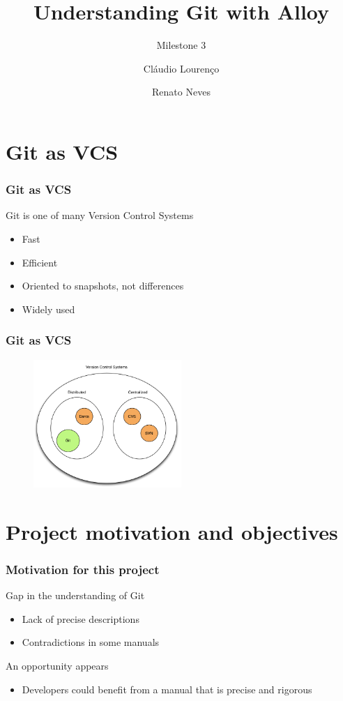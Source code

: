 \documentclass{beamer}
\title{Understanding Git with Alloy}
\subtitle{Milestone 3}
\author{Cláudio Lourenço \and Renato Neves}
\institute{University of Minho\\
Formal Methods in Software Engineering}
\begin{document}
\frame {
   \titlepage
}


\section{Git as VCS}

\begin{frame}
	\frametitle{Git as VCS}
	\begin{block}{Git is one of many Version Control Systems}
		\begin{itemize}
		\item Fast
		\item Efficient
		\item Oriented to snapshots, not differences
		\item Widely used
	\end{itemize}
	\end{block}
\end{frame}
\begin{frame}
   \frametitle{Git as VCS}
   \begin{figure}
      \centering
      \includegraphics[width=0.5\textwidth]{images/VCS.png}
   \end{figure}
\end{frame}

\section{Project motivation and objectives}
\begin{frame}
	\frametitle{Motivation for this project}
	\begin{block}{Gap in the understanding of Git}
		\begin{itemize}
		\item Lack of precise descriptions
		\item Contradictions in some manuals
		\end{itemize}
	\end{block}
	\begin{block}{An opportunity  appears}
	\begin{itemize}
	\item Developers could benefit from a manual
		that is precise and rigorous
	\end{itemize}
	\end{block}
\end{frame}
\end{document}
